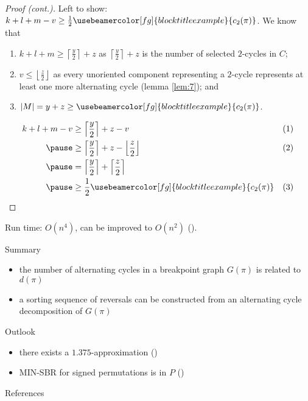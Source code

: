 \documentclass{beamer}
\theoremstyle{definition}
\def\spadding{\vspace{0.25cm}}
\def\g#1{{\usebeamercolor[fg]{block title example}{#1}}}
\begin{document}
\begin{frame}

\begin{proof}[Proof (cont.)]
Left to show: $k+l+m-v \geq \frac{1}{2} \g{c_2(\pi)}$. \pause We know that
\begin{enumerate}
    \item $k+l+m \geq \left\lceil \frac{y}{2} \right\rceil + z$ as $\left\lceil \frac{y}{2} \right\rceil + z$ is the number of selected $2$-cycles in $C$\pause;
    \item $v \leq \left\lfloor \frac{z}{2} \right\rfloor$ as every unoriented component representing a $2$-cycle represents at least one more alternating cycle (lemma \ref{lem:7})\pause; and
    \item $|M| = y+z \geq \g{c_2(\pi)}$.
\end{enumerate}\pause
\begin{align*}
    k+l+m-v &\geq \left\lceil \frac{y}{2} \right\rceil + z - v                                          & (1) \\ \pause
            &\geq \left\lceil \frac{y}{2} \right\rceil + z - \left\lfloor \frac{z}{2} \right\rfloor     & (2) \\ \pause
            &= \left\lceil \frac{y}{2} \right\rceil + \left\lceil \frac{z}{2} \right\rceil \\ \pause
            &\geq \frac{1}{2} \g{c_2(\pi)}                                                              & (3)
\end{align*}
\end{proof}

\end{frame}

\begin{frame}

Run time: $O(n^4)$, can be improved to $O(n^2)$ (\citeauthor*{Kaplan1997}).\spadding

\begin{block}{Summary}
\begin{itemize}
    \item the number of alternating cycles in a breakpoint graph $G(\pi)$ is related to $d(\pi)$
    \item a sorting sequence of reversals can be constructed from an alternating cycle decomposition of $G(\pi)$
\end{itemize}
\end{block}

\begin{block}{Outlook}
\begin{itemize}
    \item there exists a $1.375$-approximation (\citeauthor*{Berman2001})
    \item MIN-SBR for signed permutations is in $P$ (\citeauthor*{Hannenhalli1995})
\end{itemize}
\end{block}

\end{frame}

\begin{frame}[allowframebreaks]{References}

\printbibliography

\end{frame}
\end{document}
